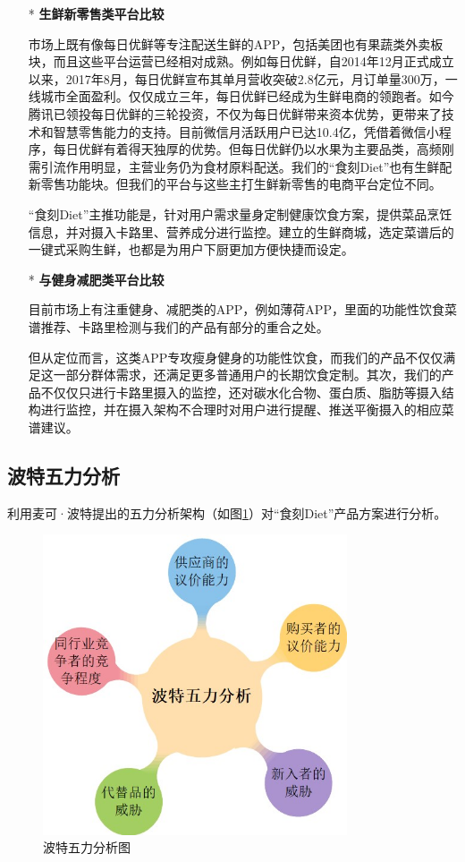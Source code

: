 \documentclass[UTF8,12pt]{ctexart}
\numberwithin{figure}{section}%
\begin{document}
\begin{spacing}{2}
\begin{itemize}
	\item[*]\textbf{生鲜新零售类平台比较} 
	
	\setlength{\parindent}{2em}市场上既有像每日优鲜等专注配送生鲜的APP，包括美团也有果蔬类外卖板块，而且这些平台运营已经相对成熟。例如每日优鲜，自2014年12月正式成立以来，2017年8月，每日优鲜宣布其单月营收突破2.8亿元，月订单量300万，一线城市全面盈利。仅仅成立三年，每日优鲜已经成为生鲜电商的领跑者。如今腾讯已领投每日优鲜的三轮投资，不仅为每日优鲜带来资本优势，更带来了技术和智慧零售能力的支持。目前微信月活跃用户已达10.4亿，凭借着微信小程序，每日优鲜有着得天独厚的优势。但每日优鲜仍以水果为主要品类，高频刚需引流作用明显，主营业务仍为食材原料配送。我们的“食刻Diet”也有生鲜配新零售功能块。但我们的平台与这些主打生鲜新零售的电商平台定位不同。
	
	“食刻Diet”主推功能是，针对用户需求量身定制健康饮食方案，提供菜品烹饪信息，并对摄入卡路里、营养成分进行监控。建立的生鲜商城，选定菜谱后的一键式采购生鲜，也都是为用户下厨更加方便快捷而设定。
	
	\item[*]\textbf{与健身减肥类平台比较}
	
	\setlength{\parindent}{2em}目前市场上有注重健身、减肥类的APP，例如薄荷APP，里面的功能性饮食菜谱推荐、卡路里检测与我们的产品有部分的重合之处。
	
	但从定位而言，这类APP专攻瘦身健身的功能性饮食，而我们的产品不仅仅满足这一部分群体需求，还满足更多普通用户的长期饮食定制。其次，我们的产品不仅仅只进行卡路里摄入的监控，还对碳水化合物、蛋白质、脂肪等摄入结构进行监控，并在摄入架构不合理时对用户进行提醒、推送平衡摄入的相应菜谱建议。
	
\end{itemize}

\subsection{波特五力分析}

利用麦可·波特提出的五力分析架构（如图\ref{wuli}）对“食刻Diet”产品方案进行分析。

\begin{figure}[!htb]
	\centering
	\includegraphics[width=9cm]{fig/botewuli}
	\caption{波特五力分析图}\label{wuli}
\end{figure}


\end{spacing}
\end{document}
